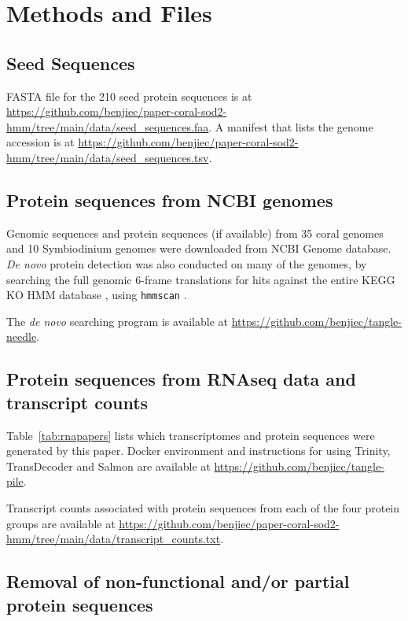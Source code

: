 
\section*{Methods and Files}


\subsection*{Seed Sequences}

FASTA file for the 210 seed protein sequences is at 
\url{https://github.com/benjiec/paper-coral-sod2-hmm/tree/main/data/seed_sequences.faa}.
A manifest that lists the genome accession is at
\url{https://github.com/benjiec/paper-coral-sod2-hmm/tree/main/data/seed_sequences.tsv}.


\subsection*{Protein sequences from NCBI genomes}

Genomic sequences and protein sequences (if available) from 35 coral genomes
and 10 Symbiodinium genomes were downloaded from NCBI Genome database.
\textit{De novo} protein detection was also conducted on many of the genomes,
by searching the full genomic 6-frame translations for hits against the entire
KEGG KO HMM database \cite{kofam}, using \texttt{hmmscan} \cite{eddy2011hmmer}.

The \textit{de novo} searching program is available at
\url{https://github.com/benjiec/tangle-needle}.


\subsection*{Protein sequences from RNAseq data and transcript counts}

Table~\ref{tab:rnapapers} lists which transcriptomes and protein sequences were
generated by this paper. Docker environment and instructions for using Trinity,
TransDecoder \cite{trinity} and Salmon \cite{salmon} are available at
\url{https://github.com/benjiec/tangle-pile}.

Transcript counts associated with protein sequences from each of the four
protein groups are available at
\url{https://github.com/benjiec/paper-coral-sod2-hmm/tree/main/data/transcript_counts.txt}.


\subsection*{Removal of non-functional and/or partial protein sequences}

